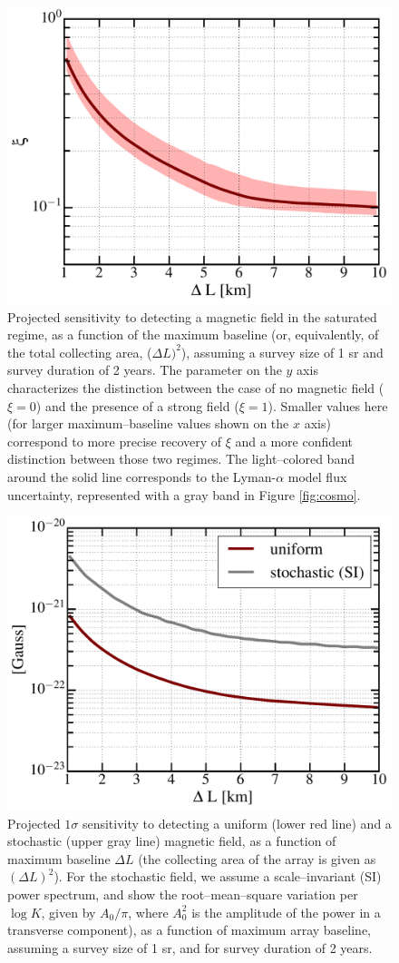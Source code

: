 \begin{figure}
\centering
\includegraphics[width=.35\textwidth,keepaspectratio=true]{xi_vs_deltas.pdf}
\caption{Projected sensitivity to detecting a magnetic field in the saturated regime, as a function of the maximum baseline (or, equivalently, of the total collecting area, ($\Delta L)^2$), assuming a survey size of 1 sr and survey duration of 2 years. The parameter on the $y$ axis characterizes the distinction between the case of no magnetic field ($\xi=0$) and the presence of a strong field ($\xi=1$). Smaller values here (for larger maximum--baseline values shown on the $x$ axis) correspond to more precise recovery of $\xi$ and a more confident distinction between those two regimes. The light--colored band around the solid line corresponds to the Lyman-$\alpha$ model flux uncertainty, represented with a gray band in Figure \ref{fig:cosmo}.\label{fig:xi_vs_deltas}}
\end{figure}
\begin{figure}
\centering
\includegraphics[width=.35\textwidth,keepaspectratio=true]{B_vs_deltas.pdf}
\caption{Projected $1\sigma$ sensitivity to detecting a uniform (lower red line) and a stochastic (upper gray line) magnetic field, as a function of maximum baseline $\Delta L$ (the collecting area of the array is given as $(\Delta L)^2$).  For the stochastic field, we assume a scale--invariant (SI) power spectrum, and show the root--mean--square variation per $\log K$, given by $A_0/\pi$, where $A_0^2$ is the amplitude of the power in a transverse component), as a function of maximum array baseline, assuming a survey size of 1 sr, and for survey duration of 2 years.\label{fig:B_vs_deltas}}
\end{figure}

